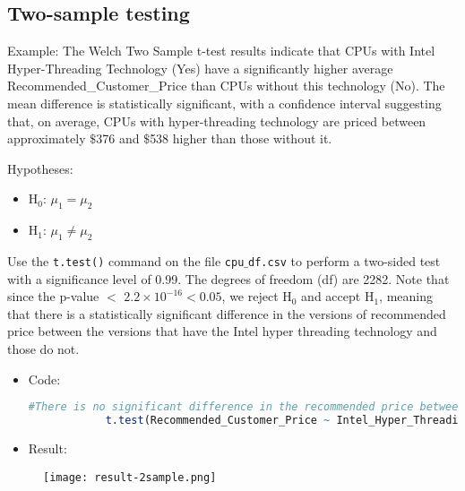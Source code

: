 \documentclass{article}
\begin{document}
	\subsection{Two-sample testing}
	
	Example: The Welch Two Sample t-test results indicate that CPUs with Intel Hyper-Threading Technology (Yes) have a significantly higher average Recommended\_Customer\_Price than CPUs without this technology (No). The mean difference is statistically significant, with a confidence interval suggesting that, on average, CPUs with hyper-threading technology are priced between approximately $\$$376 and $\$$538 higher than those without it.
	
	Hypotheses:
	\begin{itemize}
		\item H$_0$: $\mu_1 = \mu_2$
		\item H$_1$: $\mu_1 \ne \mu_2$
	\end{itemize}
	
	Use the \texttt{t.test()} command on the file \texttt{cpu$\_$df.csv} to perform a two-sided test with a significance level of 0.99. The degrees of freedom (df) are 2282. Note that since the p-value $<$ $2.2 \times 10^{-16} < 0.05$, we reject H$_0$ and accept H$_1$, meaning that there is a statistically significant difference in the versions of recommended price between the versions that have the Intel hyper threading technology and those do not.
	\begin{itemize}
		\item
		Code:
		\begin{lstlisting}[language=R]
			#There is no significant difference in the recommended price between CPUs equipped with Intel Hyper-Threading Technology and those without it.
			t.test(Recommended_Customer_Price ~ Intel_Hyper_Threading_Technology_, data = cpu_df, conf.level = 0.99)
		\end{lstlisting}
		\item Result:
	\end{itemize}
	\begin{figure}[h]
		\centering
		\texttt{[image: result-2sample.png]}
		\label{fig:enter-label}
	\end{figure}
\end{document}
